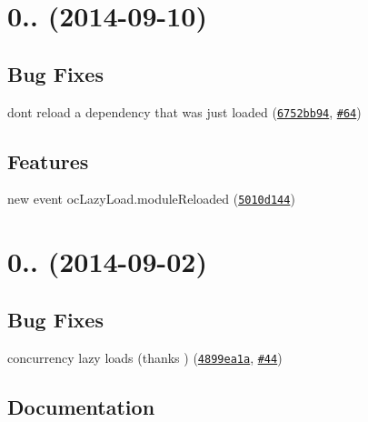 \label{_0.3.7}%
 \section*{0.. (2014-\/09-\/10)}

\subsection*{Bug Fixes}


\begin{DoxyItemize}
\item don\textquotesingle{}t reload a dependency that was just loaded (\href{https://github.com/ocombe/ocLazyLoad/commit/6752bb948093f196311572530d814231dc2dcd3a}{\tt 6752bb94}, \href{https://github.com/ocombe/ocLazyLoad/issues/64}{\tt \#64})
\end{DoxyItemize}

\subsection*{Features}


\begin{DoxyItemize}
\item new event oc\+Lazy\+Load.\+module\+Reloaded (\href{https://github.com/ocombe/ocLazyLoad/commit/5010d144d1b250424be2bcfa98faf50c6782bf96}{\tt 5010d144})
\end{DoxyItemize}

\label{_0.3.6}%
 \section*{0.. (2014-\/09-\/02)}

\subsection*{Bug Fixes}


\begin{DoxyItemize}
\item concurrency lazy loads (thanks ) (\href{https://github.com/ocombe/ocLazyLoad/commit/4899ea1a09bee145f70aec3dd964f885060422d8}{\tt 4899ea1a}, \href{https://github.com/ocombe/ocLazyLoad/issues/44}{\tt \#44})
\end{DoxyItemize}

\subsection*{Documentation}


